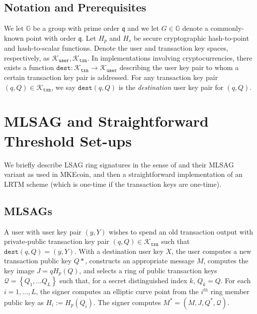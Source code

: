 \documentclass{mrl}
\theoremstyle{definition}
\begin{document}
\subsection{Notation and Prerequisites}

We let $\mathbb{G}$ be a group with prime order $\mathfrak{q}$ and we let $G \in \mathbb{G}$ denote a commonly-known point with order $\mathfrak{q}$. Let $H_p$ and $H_s$ be secure cryptographic hash-to-point and hash-to-scalar functions. Denote the user and transaction key spaces, respectively, as $\mathcal{K}_{\texttt{user}}, \mathcal{K}_{\texttt{txn}}$. In implementations involving cryptocurrencies, there exists a function $\texttt{dest}:\mathcal{K}_{\texttt{txn}} \to \mathcal{K}_{\texttt{user}}$ describing the user key pair to whom a certain transaction key pair is addressed. For any transaction key pair $(q,Q) \in \mathcal{K}_{\texttt{txn}}$, we say $\texttt{dest}(q,Q)$ is the \textit{destination} user key pair for $(q,Q)$. %


\section{MLSAG and Straightforward Threshold Set-ups}


We briefly describe LSAG ring signatures in the sense of \cite{liu2004linkable} and their MLSAG variant as used in MKEcoin, and then a straightforward implementation of an LRTM scheme (which is one-time if the transaction keys are one-time). 

\subsection{MLSAGs}

A user with user key pair $(y,Y)$ wishes to spend an old transaction output with private-public transaction key pair $(q,Q) \in \mathcal{K}_{\texttt{txn}}$ such that $\texttt{dest}(q,Q) = (y,Y)$. With a destination user key $X$, the user computes a new transaction public key $Q*$, constructs an appropriate message $M$, computes the key image $J = qH_p(Q)$, and selects a ring of public transaction keys $\mathcal{Q}=\left\{Q_1, \ldots Q_L\right\}$ such that, for a secret distinguished index $k$, $Q_{k}=Q$. For each $i=1,\ldots,L$, the signer computes an elliptic curve point from the $i^{th}$ ring member public key  as $H_i := H_{p}(Q_i)$. The signer computes $M^* = (M, J, Q^*, \mathcal{Q})$.
\end{document}
